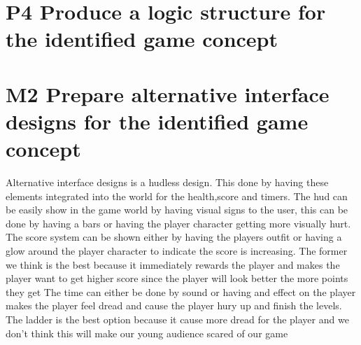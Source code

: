 \documentclass{article}
\begin{document}
\section{P4 Produce a logic structure for the identified game concept}




\section{M2 Prepare alternative interface designs for the identified game concept}
Alternative interface designs is a hudless design. This done by having these elements integrated into the world for the health,score and timers. 
The hud can be easily show in the game world by having visual signs to the user, this can be done by having a bars or having the player character getting more visually hurt.
The score system can be shown either by having the players outfit or having a glow around the player character to indicate the score is increasing. The former we think is the best because it immediately rewards the player and makes the player want to get higher score since the player will look better the more points they get 
The time can either be done by sound or having and effect on the player makes the player feel dread and cause the player hury up and finish the levels. The ladder is the best option because it cause more dread for the player and we don't think this will make our young audience scared of our game
\end{document}
